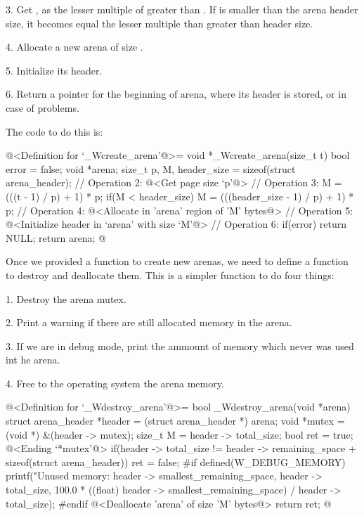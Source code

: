 3. Get , as the lesser multiple of
 greater than . If  is
smaller than the arena header size, it becomes equal the lesser
multiple than  greater than header size.

4. Allocate a new arena of size .

5. Initialize its header.

6. Return a pointer for the beginning of arena, where its header is
stored, or  in case of problems.

The code to do this is:

\iniciocodigo
@<Definition for `\_Wcreate\_arena'@>=
void *_Wcreate_arena(size_t t){
  bool error = false;
  void *arena;
  size_t p, M, header_size = sizeof(struct arena_header);
  // Operation 2:
  @<Get page size `p'@>
  // Operation 3:
  M = (((t - 1) / p) + 1) * p;
  if(M < header_size)
    M = (((header_size - 1) / p) + 1) * p;
  // Operation 4:
  @<Allocate in 'arena' region of 'M' bytes@>
  // Operation 5:
  @<Initialize header in `arena' with size `M'@>
  // Operation 6:
  if(error) return NULL;
  return arena;
}
@
\fimcodigo


Once we provided a function to create new arenas, we need to define a
function to destroy and deallocate them. This is a simpler function to
do four things:

1. Destroy the arena mutex.

2. Print a warning if there are still allocated memory in the arena.

3. If we are in debug mode, print the ammount of memory which never
was used int he arena.

4. Free to the operating system the arena memory.

\iniciocodigo
@<Definition for `\_Wdestroy\_arena'@>=
bool _Wdestroy_arena(void *arena){
  struct arena_header *header = (struct arena_header *) arena;
  void *mutex = (void *) &(header -> mutex);
  size_t M = header -> total_size;
  bool ret = true;
  @<Ending `*mutex'@>
  if(header -> total_size != header -> remaining_space +
     sizeof(struct arena_header))
    ret = false;
#if defined(W_DEBUG_MEMORY)
  printf("Unused memory: %
         header -> smallest_remaining_space, header -> total_size,
         100.0 *
         ((float) header -> smallest_remaining_space) / header -> total_size);
#endif
  @<Deallocate 'arena' of size 'M' bytes@>
  return ret;
}
@
\fimcodigo

